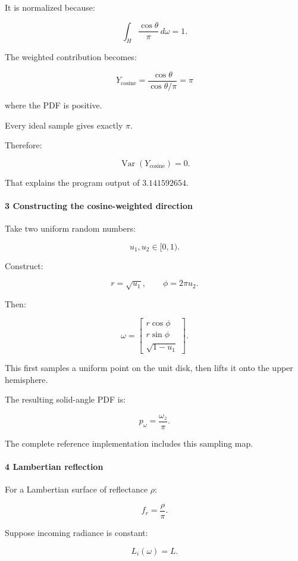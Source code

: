 It is normalized because:

\[
 \int_H\frac{\cos\theta}{\pi}\,d\omega=1.
\]

The weighted contribution becomes:

\[
 Y_{\mathrm{cosine}} = \frac{\cos\theta}{\cos\theta/\pi} =\boxed{\pi}
\]

where the PDF is positive.

Every ideal sample gives exactly \(\pi\).

Therefore:

\[
 \boxed{ \operatorname{Var}(Y_{\mathrm{cosine}})=0 }.
\]

That explains the program output of \(3.141592654\).

\paragraph{3 Constructing the cosine-weighted direction}\label{constructing-the-cosine-weighted-direction}

Take two uniform random numbers:

\[
 u_1,u_2\in[0,1).
\]

Construct:

\[
 r=\sqrt{u_1}, \qquad \phi=2\pi u_2.
\]

Then:

\[
 \boxed{ \omega= \begin{bmatrix} r\cos\phi\\ r\sin\phi\\ \sqrt{1-u_1} \end{bmatrix} }.
\]

This first samples a uniform point on the unit disk, then lifts it onto the upper hemisphere.

The resulting solid-angle PDF is:

\[
 \boxed{ p_\omega=\frac{\omega_z}{\pi} }.
\]

The complete reference implementation includes this sampling map.

\paragraph{4 Lambertian reflection}\label{lambertian-reflection}

For a Lambertian surface of reflectance \(\rho\):

\[
 f_r=\frac\rho\pi.
\]

Suppose incoming radiance is constant:

\[
 L_i(\omega)=L.
\]

